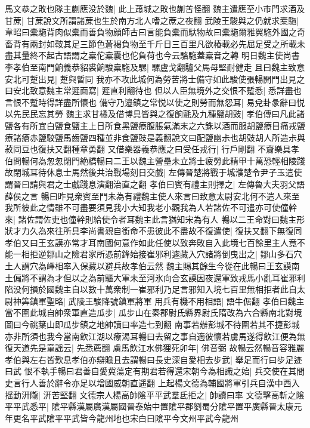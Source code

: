 馬文恭之敗也隊主蒯應没於魏|{
	此上蕭城之敗也蒯苦怪翻}
魏主遣應至小市門求酒及甘蔗|{
	甘蔗說文所謂諸蔗也生於南方北人嗜之蔗之夜翻}
武陵王駿與之仍就求槖駞|{
	韋昭曰槖駞背肉似槖而善負物顔師古曰言能負槖而馱物故曰槖駞爾雅翼駞外國之奇畜背有兩封如鞍其足三節色蒼褐負物至千斤日三百里凡欲椿載必先屈足受之所載未盡其量終不起古語謂之槖佗槖囊也佗負荷也今云駱駞蓋槖音之轉}
明日魏主使尚書李孝伯至南門餉義恭貂裘餉駿槖駞及騾|{
	騾盧戈翻驢父馬母堅耐健走}
且曰魏主致意安北可蹔出見|{
	蹔與暫同}
我亦不攻此城何為勞苦將士備守如此駿使張暢開門出見之曰安北致意魏主常遲面寫|{
	遲直利翻待也}
但以人臣無境外之交恨不蹔悉|{
	悉詳盡也言恨不蹔時得詳盡所懷也}
備守乃邉鎮之常悦以使之則勞而無怨耳|{
	易兌卦彖辭曰悦以先民民忘其勞}
魏主求甘橘及借博具皆與之復餉氈及九種鹽胡豉|{
	孝伯傳曰凡此諸鹽各有所宜白鹽食鹽主上日所食黑鹽療腹脹氣滿末之六銖以酒而服胡鹽療目痛戎鹽療諸瘡赤鹽駮鹽馬齒鹽四種並非食鹽豉是義翻說文曰配鹽幽尗也胡豉胡人所造尗與菽同豆也復扶又翻種章勇翻}
又借樂器義恭應之曰受任戎行|{
	行戶剛翻}
不齎樂具孝伯問暢何為怱怱閉門絶橋暢曰二王以魏主營壘未立將士疲勞此精甲十萬恐輕相陵踐故閉城耳待休息士馬然後共治戰場刻日交戲|{
	左傳晉楚將戰于城濮楚令尹子玉遣使謂晉曰請與君之士戲踐息演翻治直之翻}
孝伯曰賓有禮主則擇之|{
	左傳魯大夫羽父語薛侯之言}
暢曰昨見衆賓至門未為有禮魏主使人來言曰致意太尉安北何不遣人來至我所彼此之情雖不可盡要須見我小大知我老小觀我為人若諸佐不可遣亦可使僮幹來|{
	諸佐謂佐吏也僮幹則給使令者耳魏主此言猶知宋為有人}
暢以二王命對曰魏主形狀才力久為來往所具李尚書親自銜命不患彼此不盡故不復遣使|{
	復扶又翻下無復同}
孝伯又曰王玄謨亦常才耳南國何意作如此任使以致奔敗自入此境七百餘里主人竟不能一相拒逆鄒山之險君家所憑前鋒始接崔邪利遽藏入穴諸將倒曳出之|{
	鄒山多石穴土人謂穴為嶧相率入保藏以避兵故孝伯云然}
魏主賜其餘生今從在此暢曰王玄謨南土偏將不謂為才但以之為前驅大軍未至河氷向合玄謨因夜還軍致戎馬小亂耳崔邪利陷没何損於國魏主自以數十萬衆制一崔邪利乃足言邪知入境七百里無相拒者此自太尉神筭鎮軍聖略|{
	武陵王駿降號鎮軍將軍}
用兵有機不用相語|{
	語牛倨翻}
孝伯曰魏主當不圍此城自帥衆軍直造瓜步|{
	瓜步山在秦郡尉氏縣界尉氏隋改為六合縣南北對境圖曰今祧葉山即瓜步鎮之地帥讀曰率造七到翻}
南事若辦彭城不待圍若其不捷彭城亦非所須也我今當南飲江湖以療渴耳暢曰去留之事自適彼懷若虜馬遂得飲江便為無復天道先是童謡云|{
	先悉薦翻}
虜馬飲江水佛狸死卯年|{
	佛音弼}
故暢云然暢音容雅麗孝伯與左右皆歎息孝伯亦辯贍且去謂暢曰長史深自愛相去步武|{
	舉足而行曰步足迹曰武}
恨不執手暢曰君善自愛冀蕩定有期君若得還宋朝今為相識之始|{
	兵交使在其間史言行人善於辭令亦足以增國威朝直遥翻}
上起楊文德為輔國將軍引兵自漢中西入揺動汧隴|{
	汧苦堅翻}
文德宗人楊高帥隂平平武羣氐拒之|{
	帥讀曰率}
文德擊高斬之隂平平武悉平|{
	隂平縣漢屬廣漢屬國晉泰始中置隂平郡劉蜀分隂平置平廣縣晉太康元年更名平武隂平平武皆今龍州地也宋白曰隂平今文州平武今龍州}
